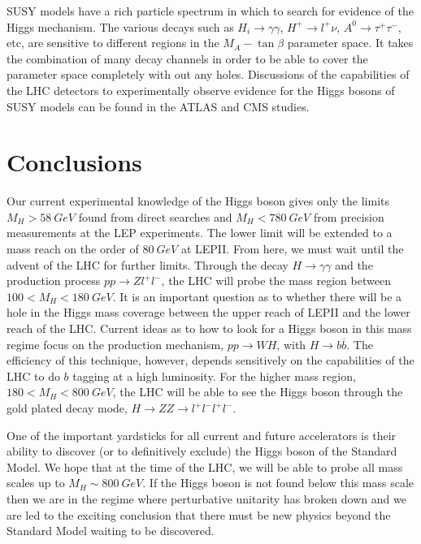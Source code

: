   SUSY models have a rich particle spectrum in
which to search for evidence of the Higgs mechanism.
The various decays such as $H_i\rightarrow \gamma\gamma$, $H^+\rightarrow
l^+\nu$, $A^0\rightarrow \tau^+\tau^-$, etc, are sensitive to
different regions in the $M_A-\tan\beta$ parameter space.
It takes the combination of many decay channels
in order to be able to cover the  parameter space completely with out
any holes.  Discussions of the capabilities of the LHC detectors
to experimentally observe evidence for the Higgs bosons of SUSY
models can be found in the ATLAS\cite{atlas} and CMS\cite{cms}
studies.

\section{Conclusions}

Our current experimental
 knowledge  of the Higgs boson gives only the limits $M_H> 58~GeV$
found from direct searches
and $M_H< 780~GeV$ from precision measurements
at the LEP experiments.  The lower limit
 will be extended to a mass reach on the
order of $80~GeV$ at LEPII.  From here, we must wait until the advent of the
LHC for further limits.  Through the decay $H\rightarrow \gamma \gamma$
and the production process $pp\rightarrow Z l^+l^-$, the LHC will
probe the mass region between $100< M_H< 180~GeV$.  It is an important
question as to whether there will be a hole in
the Higgs mass coverage between the upper reach of LEPII
and the lower reach of the LHC.
Current ideas as to how to look for a Higgs boson in this
mass regime focus on the production mechanism, $pp\rightarrow WH$,
with $H\rightarrow b {\overline b}$.  The efficiency of this
technique, however, depends sensitively on the capabilities of
the LHC to do $b$ tagging at a high luminosity.
For the higher mass region, $180< M_H < 800~GeV$, the LHC will be able
to see the Higgs boson through the gold plated decay mode, $H\rightarrow
ZZ\rightarrow l^+l^-l^+l^-$.




One of the important yardsticks for all current and future accelerators is
their
ability to discover (or to definitively exclude) the Higgs boson
of the Standard Model.
We  hope that at the time of the LHC, we will be able to
probe all mass scales up to $M_H\sim 800~GeV$.  If the Higgs boson is not
  found below this mass scale then we are in the regime where
perturbative unitarity has broken down
and we are led to the
exciting conclusion that there must be new physics beyond the Standard Model
waiting to be discovered.

